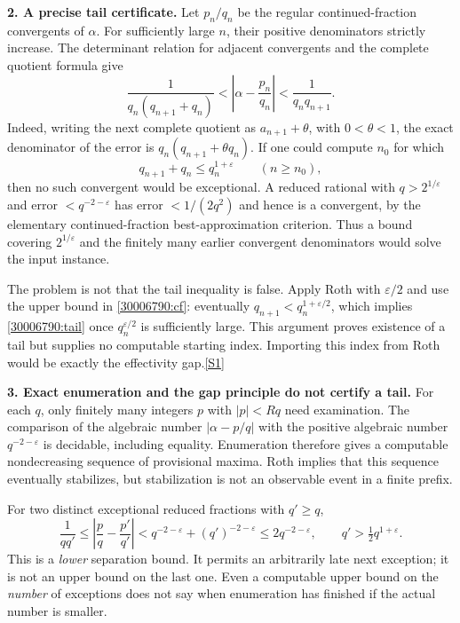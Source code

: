 \documentclass[11pt,a4paper]{article}
\newcommand{\eps}{\varepsilon}
\newcommand{\sref}[2]{\hyperlink{source:#1:#2}{[S#2]}}
\begin{document}
\textbf{2. A precise tail certificate.}
Let $p_n/q_n$ be the regular continued-fraction convergents of $\alpha$.
For sufficiently large $n$, their positive denominators strictly increase.
The determinant relation for adjacent convergents and the complete
quotient formula give
\begin{equation}\label{30006790:cf}
 \frac{1}{q_n(q_{n+1}+q_n)}
 <\left|\alpha-\frac{p_n}{q_n}\right|
 <\frac{1}{q_nq_{n+1}}.
\end{equation}
Indeed, writing the next complete quotient as $a_{n+1}+\theta$, with
$0<\theta<1$, the exact denominator of the error is
$q_n(q_{n+1}+\theta q_n)$.
If one could compute $n_0$ for which
\begin{equation}\label{30006790:tail}
 q_{n+1}+q_n\le q_n^{1+\eps}\qquad(n\ge n_0),
\end{equation}
then no such convergent would be exceptional. A reduced rational with
$q>2^{1/\eps}$ and error $<q^{-2-\eps}$ has error $<1/(2q^2)$ and hence
is a convergent, by the elementary continued-fraction best-approximation
criterion. Thus a bound covering $2^{1/\eps}$ and the finitely many earlier
convergent denominators would solve the input instance.

The problem is not that the tail inequality is false. Apply Roth with
$\eps/2$ and use the upper bound in \eqref{30006790:cf}: eventually
$q_{n+1}<q_n^{1+\eps/2}$, which implies \eqref{30006790:tail} once
$q_n^{\eps/2}$ is sufficiently large. This argument proves existence of a
tail but supplies no computable starting index. Importing this index from
Roth would be exactly the effectivity gap.\sref{30006790}{1}

\textbf{3. Exact enumeration and the gap principle do not certify a tail.}
For each $q$, only finitely many integers $p$ with $|p|<Rq$ need examination.
The comparison of the algebraic number $|\alpha-p/q|$ with the positive
algebraic number $q^{-2-\eps}$ is decidable, including equality. Enumeration
therefore gives a computable nondecreasing sequence of provisional maxima.
Roth implies that this sequence eventually stabilizes, but stabilization
is not an observable event in a finite prefix.

For two distinct exceptional reduced fractions with $q'\ge q$,
\[
 \frac1{qq'}\le\left|\frac pq-\frac{p'}{q'}\right|
 <q^{-2-\eps}+(q')^{-2-\eps}\le2q^{-2-\eps},
 \qquad q'>\tfrac12q^{1+\eps}.
\]
This is a \emph{lower} separation bound. It permits an arbitrarily late
next exception; it is not an upper bound on the last one. Even a computable
upper bound on the \emph{number} of exceptions does not say when enumeration
has finished if the actual number is smaller.
\end{document}
